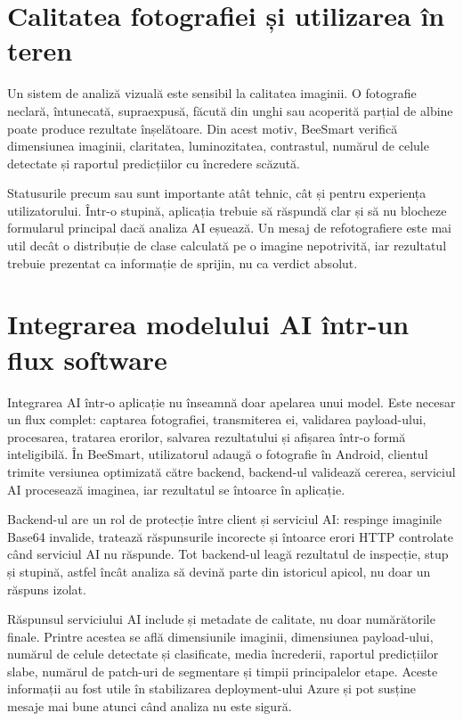 \section{Calitatea fotografiei și utilizarea în teren}

Un sistem de analiză vizuală este sensibil la calitatea imaginii. O fotografie neclară, întunecată, supraexpusă, făcută din unghi sau acoperită parțial de albine poate produce rezultate înșelătoare. Din acest motiv, BeeSmart verifică dimensiunea imaginii, claritatea, luminozitatea, contrastul, numărul de celule detectate și raportul predicțiilor cu încredere scăzută.

Statusurile precum  sau  sunt importante atât tehnic, cât și pentru experiența utilizatorului. Într-o stupină, aplicația trebuie să răspundă clar și să nu blocheze formularul principal dacă analiza AI eșuează. Un mesaj de refotografiere este mai util decât o distribuție de clase calculată pe o imagine nepotrivită, iar rezultatul trebuie prezentat ca informație de sprijin, nu ca verdict absolut.

\section{Integrarea modelului AI într-un flux software}

Integrarea AI într-o aplicație nu înseamnă doar apelarea unui model. Este necesar un flux complet: captarea fotografiei, transmiterea ei, validarea payload-ului, procesarea, tratarea erorilor, salvarea rezultatului și afișarea într-o formă inteligibilă. În BeeSmart, utilizatorul adaugă o fotografie în Android, clientul trimite versiunea optimizată către backend, backend-ul validează cererea, serviciul AI procesează imaginea, iar rezultatul se întoarce în aplicație.

Backend-ul are un rol de protecție între client și serviciul AI: respinge imaginile Base64 invalide, tratează răspunsurile incorecte și întoarce erori HTTP controlate când serviciul AI nu răspunde. Tot backend-ul leagă rezultatul de inspecție, stup și stupină, astfel încât analiza să devină parte din istoricul apicol, nu doar un răspuns izolat.

Răspunsul serviciului AI include și metadate de calitate, nu doar numărătorile finale. Printre acestea se află dimensiunile imaginii, dimensiunea payload-ului, numărul de celule detectate și clasificate, media încrederii, raportul predicțiilor slabe, numărul de patch-uri de segmentare și timpii principalelor etape. Aceste informații au fost utile în stabilizarea deployment-ului Azure și pot susține mesaje mai bune atunci când analiza nu este sigură.

